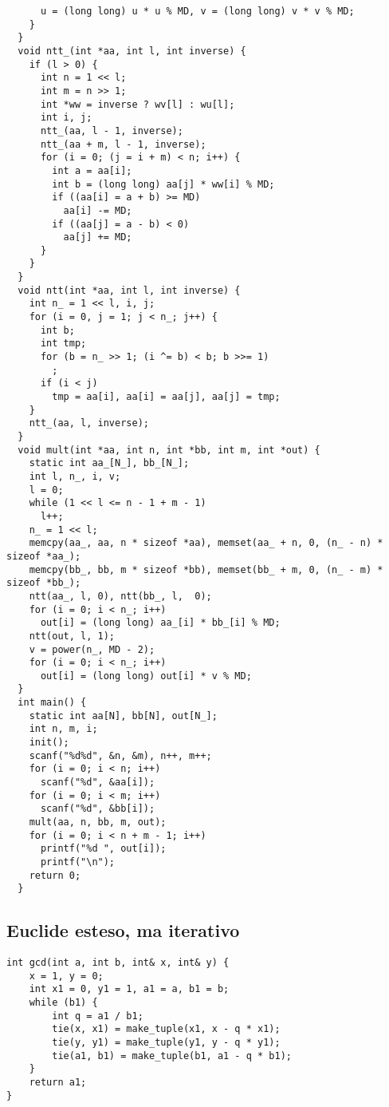 \documentclass{article}
\begin{document}
\begin{lstlisting}
      u = (long long) u * u % MD, v = (long long) v * v % MD;
    }
  }
  void ntt_(int *aa, int l, int inverse) {
    if (l > 0) {
      int n = 1 << l;
      int m = n >> 1;
      int *ww = inverse ? wv[l] : wu[l];
      int i, j;
      ntt_(aa, l - 1, inverse);
      ntt_(aa + m, l - 1, inverse);
      for (i = 0; (j = i + m) < n; i++) {
        int a = aa[i];
        int b = (long long) aa[j] * ww[i] % MD;
        if ((aa[i] = a + b) >= MD)
          aa[i] -= MD;
        if ((aa[j] = a - b) < 0)
          aa[j] += MD;
      }
    }
  }
  void ntt(int *aa, int l, int inverse) {
    int n_ = 1 << l, i, j;
    for (i = 0, j = 1; j < n_; j++) {
      int b;
      int tmp;
      for (b = n_ >> 1; (i ^= b) < b; b >>= 1)
        ;
      if (i < j)
        tmp = aa[i], aa[i] = aa[j], aa[j] = tmp;
    }
    ntt_(aa, l, inverse);
  }
  void mult(int *aa, int n, int *bb, int m, int *out) {
    static int aa_[N_], bb_[N_];
    int l, n_, i, v;
    l = 0;
    while (1 << l <= n - 1 + m - 1)
      l++;
    n_ = 1 << l;
    memcpy(aa_, aa, n * sizeof *aa), memset(aa_ + n, 0, (n_ - n) * sizeof *aa_);
    memcpy(bb_, bb, m * sizeof *bb), memset(bb_ + m, 0, (n_ - m) * sizeof *bb_);
    ntt(aa_, l, 0), ntt(bb_, l,  0);
    for (i = 0; i < n_; i++)
      out[i] = (long long) aa_[i] * bb_[i] % MD;
    ntt(out, l, 1);
    v = power(n_, MD - 2);
    for (i = 0; i < n_; i++)
      out[i] = (long long) out[i] * v % MD;
  }
  int main() {
    static int aa[N], bb[N], out[N_];
    int n, m, i;
    init();
    scanf("%d%d", &n, &m), n++, m++;
    for (i = 0; i < n; i++)
      scanf("%d", &aa[i]);
    for (i = 0; i < m; i++)
      scanf("%d", &bb[i]);
    mult(aa, n, bb, m, out);
    for (i = 0; i < n + m - 1; i++)
      printf("%d ", out[i]);
      printf("\n");
    return 0;
  }
\end{lstlisting}

\subsection{Euclide esteso, ma iterativo}
\begin{lstlisting}
int gcd(int a, int b, int& x, int& y) {
    x = 1, y = 0;
    int x1 = 0, y1 = 1, a1 = a, b1 = b;
    while (b1) {
        int q = a1 / b1;
        tie(x, x1) = make_tuple(x1, x - q * x1);
        tie(y, y1) = make_tuple(y1, y - q * y1);
        tie(a1, b1) = make_tuple(b1, a1 - q * b1);
    }
    return a1;
}
\end{lstlisting}
\end{document}
